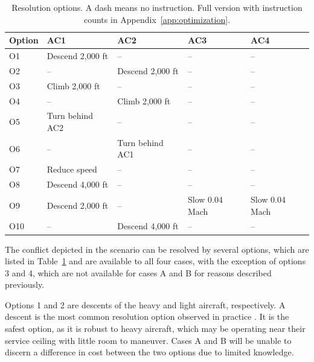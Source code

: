 \begin{table}[h]
\centering
\caption{Resolution options. A dash means no instruction. Full version with instruction counts in Appendix~\ref{app:optimization}.}
\label{tab:options}
\begin{tabular}{@{}lllll@{}}
\toprule
Option & AC1 & AC2 & AC3 & AC4 \\
\midrule
O1 & Descend 2,000 ft & -- & -- & -- \\
O2 & -- & Descend 2,000 ft & -- & -- \\
O3 & Climb 2,000 ft & -- & -- & -- \\
O4 & -- & Climb 2,000 ft & -- & -- \\
O5 & Turn behind AC2 & -- & -- & -- \\
O6 & -- & Turn behind AC1 & -- & -- \\
O7 & Reduce speed & -- & -- & -- \\
O8 & Descend 4,000 ft & -- & -- & -- \\
O9 & Descend 2,000 ft & -- & Slow 0.04 Mach & Slow 0.04 Mach \\
O10 & -- & Descend 4,000 ft & -- & -- \\
\bottomrule
\end{tabular}
\end{table}


The conflict depicted in the scenario can be resolved by several options, which are listed in Table~\ref{tab:options} and are available to all four cases, with the exception of options 3 and 4, which are not available for cases A and B for reasons described previously.

Options 1 and 2 are descents of the heavy and light aircraft, respectively. A descent is the most common resolution option observed in practice \cite{rantanen2012conflictManeuvers}. It is the safest option, as it is robust to heavy aircraft, which may be operating near their service ceiling with little room to maneuver. Cases A and B will be unable to discern a difference in cost between the two options due to limited knowledge. 

